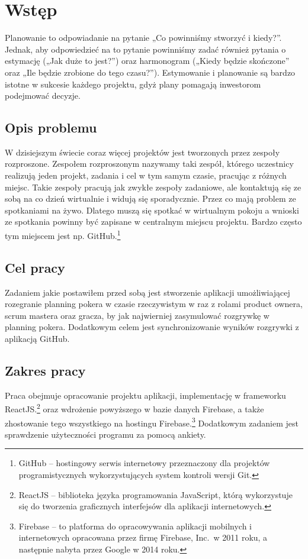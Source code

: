 ﻿\chapter*{Wstęp}
Planowanie to odpowiadanie na pytanie „Co powinniśmy stworzyć i kiedy?”.
Jednak, aby odpowiedzieć na to pytanie powinniśmy zadać również pytania o estymację
(„Jak duże to jest?”) oraz harmonogram („Kiedy będzie skończone” oraz „Ile będzie zrobione do tego czasu?”).
Estymowanie i planowanie są bardzo istotne w sukcesie każdego projektu,
gdyż plany pomagają inwestorom podejmować decyzje.\cite{Cohen_2006}
\section*{Opis problemu}

W dzisiejszym świecie coraz więcej projektów jest tworzonych przez zespoły rozproszone. Zespołem rozproszonym nazywamy taki zespół, którego uczestnicy realizują jeden projekt, zadania i cel w tym samym czasie, pracując z różnych miejsc. Takie zespoły pracują jak zwykłe zespoły zadaniowe, ale kontaktują się ze sobą na co dzień wirtualnie i widują się sporadycznie.\cite{www_rozproszony}
Przez co mają problem ze spotkaniami na żywo.
Dlatego muszą się spotkać w wirtualnym pokoju a wnioski ze spotkania powinny być zapisane w centralnym miejscu projektu.
Bardzo często tym miejscem jest np. GitHub.\footnote{GitHub – hostingowy serwis internetowy przeznaczony dla projektów programistycznych wykorzystujących system kontroli wersji Git.}

\section*{Cel pracy}

Zadaniem jakie postawiłem przed sobą jest stworzenie aplikacji umożliwiającej rozegranie planning pokera w czasie rzeczywistym w raz z rolami product ownera,
scrum mastera oraz gracza, by jak najwierniej zasymulować rozgrywkę w planning pokera.
Dodatkowym celem jest synchronizowanie wyników rozgrywki z aplikacją GitHub.

\section*{Zakres pracy}

Praca obejmuje opracowanie projektu aplikacji, implementację w frameworku ReactJS.\footnote{ReactJS – biblioteka języka programowania JavaScript, którą wykorzystuje się do tworzenia graficznych interfejsów dla aplikacji internetowych.}
oraz wdrożenie powyższego w bazie danych Firebase, a także zhostowanie tego wszystkiego na hostingu Firebase.\footnote{Firebase – to platforma do opracowywania aplikacji mobilnych i internetowych opracowana przez firmę Firebase, Inc.\ w 2011 roku, a następnie nabyta przez Google w 2014 roku.}
Dodatkowym zadaniem jest sprawdzenie użyteczności programu za pomocą ankiety.
